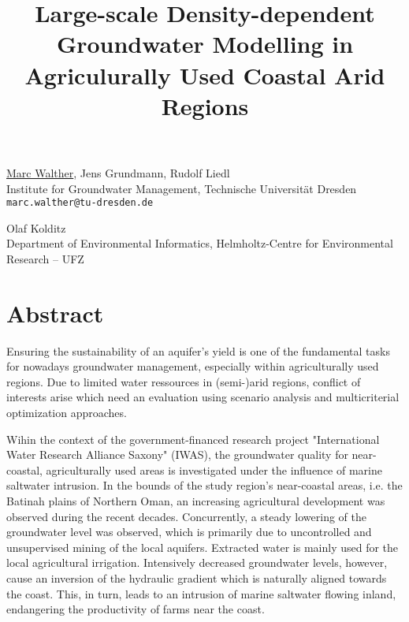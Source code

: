 \title{Large-scale Density-dependent Groundwater Modelling in Agriculurally Used Coastal Arid Regions}
\author{} \institute{}
\maketitle

\begin{center}
{\large \underline{Marc Walther}, Jens Grundmann, Rudolf Liedl}\\
Institute for Groundwater Management, Technische Universit\"at Dresden\\
{\tt marc.walther@tu-dresden.de}\\
\vspace{4mm}

{\large Olaf Kolditz}\\
Department of Environmental Informatics, Helmholtz-Centre for Environmental Research -- UFZ
\end{center}

\section*{Abstract}
Ensuring the sustainability of an aquifer's yield is one of the fundamental tasks for nowadays groundwater management, especially within agriculturally used regions. Due to limited water ressources in (semi-)arid regions, conflict of interests arise which need an evaluation using scenario analysis and multicriterial optimization approaches. 

Wihin the context of the government-financed research project "International Water Research Alliance Saxony" (IWAS), the groundwater quality for near-coastal, agriculturally used areas is investigated under the influence of marine saltwater intrusion. In the bounds of the study region's near-coastal areas, i.e. the Batinah plains of Northern Oman, an increasing agricultural development was observed during the recent decades. Concurrently, a steady lowering of the groundwater level was observed, which is primarily due to uncontrolled and unsupervised mining of the local aquifers. Extracted water is mainly used for the local agricultural irrigation. Intensively decreased groundwater levels, however, cause an inversion of the hydraulic gradient which is naturally aligned towards the coast. This, in turn, leads to an intrusion of marine saltwater flowing inland, endangering the productivity of farms near the coast.

